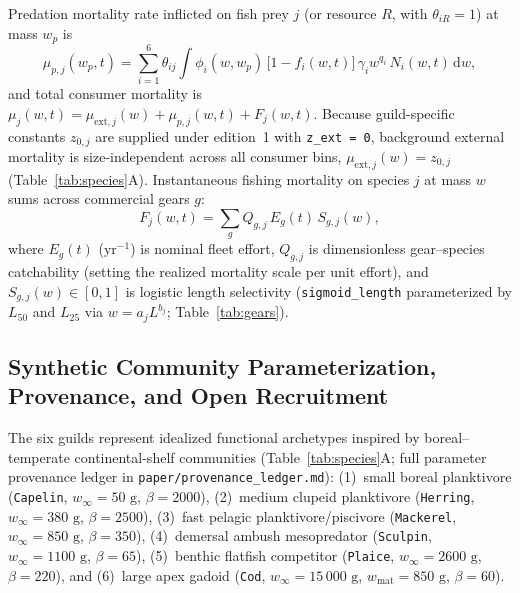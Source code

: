\documentclass[11pt,letterpaper]{article}
\begin{document}
Predation mortality rate inflicted on fish prey $j$ (or resource $R$, with $\theta_{iR} = 1$) at mass $w_p$ is
\begin{equation}
  \mu_{p,j}(w_p,t) = \sum_{i=1}^{6} \theta_{ij} \int \phi_i(w, w_p)\,\big[1 - f_i(w,t)\big]\,\gamma_i w^{q_i}\,N_i(w,t)\,\mathrm{d}w,
  \label{eq:predmort}
\end{equation}
and total consumer mortality is $\mu_j(w,t) = \mu_{\mathrm{ext},j}(w) + \mu_{p,j}(w,t) + F_j(w,t)$. Because guild-specific constants $z_{0,j}$ are supplied under edition~1 with \texttt{z\_ext = 0}, background external mortality is size-independent across all consumer bins, $\mu_{\mathrm{ext},j}(w) = z_{0,j}$ (Table~\ref{tab:species}A). Instantaneous fishing mortality on species $j$ at mass $w$ sums across commercial gears $g$:
\begin{equation}
  F_j(w,t) = \sum_{g} Q_{g,j}\,E_g(t)\,S_{g,j}(w),
  \label{eq:fishing}
\end{equation}
where $E_g(t)$ ($\text{yr}^{-1}$) is nominal fleet effort, $Q_{g,j}$ is dimensionless gear--species catchability (setting the realized mortality scale per unit effort), and $S_{g,j}(w) \in [0,1]$ is logistic length selectivity (\texttt{sigmoid\_length} parameterized by $L_{50}$ and $L_{25}$ via $w = a_j L^{b_j}$; Table~\ref{tab:gears}).

\subsection{Synthetic Community Parameterization, Provenance, and Open Recruitment}

The six guilds represent idealized functional archetypes inspired by boreal--temperate continental-shelf communities (Table~\ref{tab:species}A; full parameter provenance ledger in \texttt{paper/provenance\_ledger.md}): (1)~small boreal planktivore (\texttt{Capelin}, $w_\infty = 50\text{ g}$, $\beta = 2000$), (2)~medium clupeid planktivore (\texttt{Herring}, $w_\infty = 380\text{ g}$, $\beta = 2500$), (3)~fast pelagic planktivore/piscivore (\texttt{Mackerel}, $w_\infty = 850\text{ g}$, $\beta = 350$), (4)~demersal ambush mesopredator (\texttt{Sculpin}, $w_\infty = 1100\text{ g}$, $\beta = 65$), (5)~benthic flatfish competitor (\texttt{Plaice}, $w_\infty = 2600\text{ g}$, $\beta = 220$), and (6)~large apex gadoid (\texttt{Cod}, $w_\infty = 15\,000\text{ g}$, $w_{\mathrm{mat}} = 850\text{ g}$, $\beta = 60$).
\end{document}
